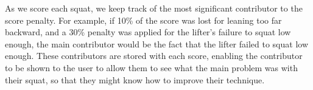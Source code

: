 As we score each squat, we keep track of the most significant contributor to the score penalty. For example, if 10\% of the score was lost for leaning too far backward, and a 30\% penalty was applied for the lifter's failure to squat low enough, the main contributor would be the fact that the lifter failed to squat low enough. These contributors are stored with each score, enabling the contributor to be shown to the user to allow them to see what the main problem was with their squat, so that they might know how to improve their technique.